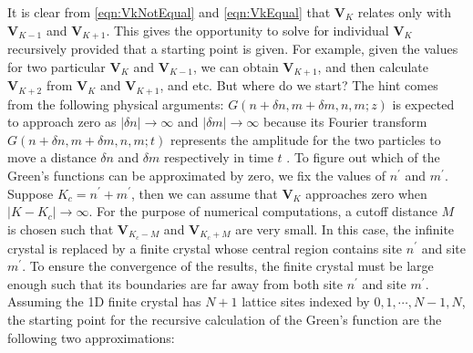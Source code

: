  It is clear from 
\autoref{eqn:VkNotEqual} and \autoref{eqn:VkEqual} that $\mathbf{V}_{K}$ relates only with  $\mathbf{V}_{K-1}$ and 
 $\mathbf{V}_{K+1}$. This gives the opportunity to solve for individual $\mathbf{V}_{K}$ recursively provided that 
a starting point is given. For example, given the values for two particular $\mathbf{V}_{K}$ and 
$\mathbf{V}_{K-1}$, we can obtain $\mathbf{V}_{K+1}$, and then calculate $\mathbf{V}_{K+2}$ from $\mathbf{V}_{K}$ 
and $\mathbf{V}_{K+1}$, and etc.  
But where do we start? The hint comes from the following physical arguments: $G(n+\delta n, m+\delta m, n, m; z)$ is 
expected to approach zero as $|\delta n| \rightarrow \infty$ and $|\delta m| \rightarrow \infty$ because its Fourier
transform $G(n+\delta n, m+\delta m, n, m; t)$ represents the amplitude for the two particles to move a distance
 $\delta n$ and  $\delta m$ respectively in time $t$ \cite{economou2006, Berciu2010}. To figure out which of the Green's 
functions can be approximated by zero, we fix  the values of $n^{\prime}$ and $m^{\prime}$. Suppose
 $K_c = n^{\prime} + m^{\prime}$, then we can assume that $\mathbf{V}_{K}$ approaches zero when 
$|K - K_c | \rightarrow \infty$. For the purpose of numerical computations, a cutoff distance $M$ is chosen such that
$\mathbf{V}_{K_c - M}$ and $\mathbf{V}_{K_c + M}$ are very small. In this case, the infinite crystal is 
replaced by a finite crystal whose central region contains site $n^{\prime}$ and site $m^{\prime}$. To ensure the
convergence of the results, the finite crystal must be large enough such that its boundaries are  far away
from both site $n^{\prime}$ and site $m^{\prime}$. Assuming the 1D finite crystal has $N+1$ lattice sites indexed by $0, 1, \cdots, 
N-1, N$, the starting point for the recursive calculation of the Green's function are the following two 
approximations:


